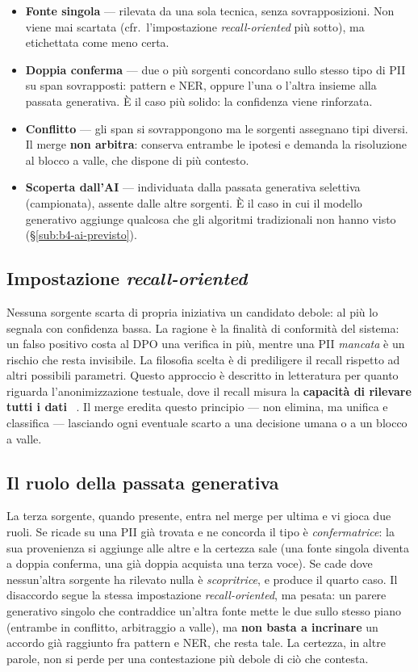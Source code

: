\begin{itemize}
	\item \textbf{Fonte singola} --- rilevata da una sola tecnica, senza sovrapposizioni. Non viene mai scartata (cfr.\ l'impostazione \emph{recall-oriented} più sotto), ma etichettata come meno certa.
	\item \textbf{Doppia conferma} --- due o più sorgenti concordano sullo stesso tipo di PII su span sovrapposti: pattern e NER, oppure l'una o l'altra insieme alla passata generativa. È il caso più solido: la confidenza viene rinforzata.
	\item \textbf{Conflitto} --- gli span si sovrappongono ma le sorgenti assegnano tipi diversi. Il merge \textbf{non arbitra}: conserva entrambe le ipotesi e demanda la risoluzione al blocco a valle, che dispone di più contesto.
	\item \textbf{Scoperta dall'AI} --- individuata dalla passata generativa selettiva (campionata), assente dalle altre sorgenti. È il caso in cui il modello generativo aggiunge qualcosa che gli algoritmi tradizionali non hanno visto (§\ref{sub:b4-ai-previsto}).
\end{itemize}

\subsection{Impostazione \textit{recall-oriented}} Nessuna sorgente scarta di propria iniziativa un candidato debole: al più lo segnala con confidenza bassa. La ragione è la finalità di conformità del sistema: un falso positivo costa al DPO una verifica in più, mentre una PII \emph{mancata} è un rischio che resta invisibile. La filosofia scelta è di prediligere il recall rispetto ad altri possibili parametri. Questo approccio è descritto in letteratura per quanto riguarda l'anonimizzazione testuale, dove il recall misura la \textbf{capacità di rilevare tutti i dati} ~\cite{pilanTextAnonymizationBenchmark2022}. Il merge eredita questo principio --- non elimina, ma unifica e classifica --- lasciando ogni  eventuale scarto a una decisione umana o a un blocco a valle.

\subsection{Il ruolo della passata generativa} La terza sorgente, quando presente, entra nel merge per ultima e vi gioca due ruoli. Se ricade su una PII già trovata e ne concorda il tipo è \emph{confermatrice}: la sua provenienza si aggiunge alle altre e la certezza sale (una fonte singola diventa a doppia conferma, una già doppia acquista una terza voce). Se cade dove nessun'altra sorgente ha rilevato nulla è \emph{scopritrice}, e produce il quarto caso. Il disaccordo segue la stessa impostazione \textit{recall-oriented}, ma pesata: un parere generativo singolo che contraddice un'altra fonte mette le due sullo stesso piano (entrambe in conflitto, arbitraggio a valle), ma \textbf{non basta a incrinare} un accordo già raggiunto fra pattern e NER, che resta tale. La certezza, in altre parole, non si perde per una contestazione più debole di ciò che contesta.


